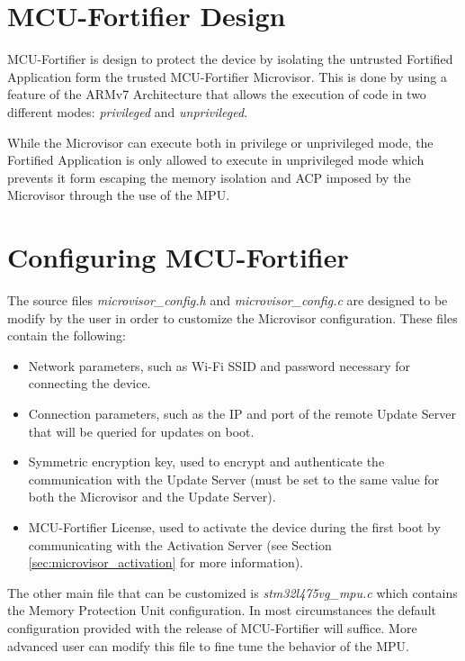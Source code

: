 \documentclass{article}
\begin{document}
\section{MCU-Fortifier Design}
MCU-Fortifier is design to protect the device by isolating the untrusted Fortified Application form the trusted MCU-Fortifier Microvisor. This is done by using a feature of the ARMv7 Architecture that allows the execution of code in two different modes: \textit{privileged} and \textit{unprivileged}.

While the Microvisor can execute both in privilege or unprivileged mode, the Fortified Application is only allowed to execute in unprivileged mode which prevents it form escaping the memory isolation and ACP imposed by the Microvisor through the use of the MPU.

\section{Configuring MCU-Fortifier}
The source files \textit{microvisor\_config.h} and \textit{microvisor\_config.c} are designed to be modify by the user in order to customize the Microvisor configuration. These files contain the following:
\begin{itemize}
	\item Network parameters, such as Wi-Fi SSID and password necessary for connecting the device.
	\item Connection parameters, such as the IP and port of the remote Update Server that will be queried for updates on boot.
	\item Symmetric encryption key, used to encrypt and authenticate the communication with the Update Server (must be set to the same value for both the Microvisor and the Update Server).
	\item MCU-Fortifier License, used to activate the device during the first boot by communicating with the Activation Server (see Section \ref{sec:microvisor_activation} for more information).
\end{itemize}

The other main file that can be customized is \textit{stm32l475vg\_mpu.c} which contains the Memory Protection Unit configuration. In most circumstances the default configuration provided with the release of MCU-Fortifier will suffice. More advanced user can modify this file to fine tune the behavior of the MPU.
\end{document}

